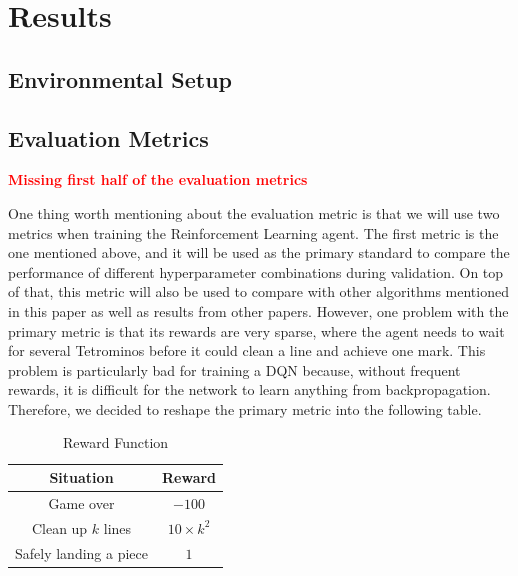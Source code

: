 \documentclass[letterpaper]{article} %
\begin{document}


\section{Results}
\subsection{Environmental Setup}
\subsection{Evaluation Metrics}

\textcolor{red}{\textbf{Missing first half of the evaluation metrics}}

One thing worth mentioning about the evaluation metric is that we will use two metrics when training the Reinforcement Learning agent. The first metric is the one mentioned above, and it will be used as the primary standard to compare the performance of different hyperparameter combinations during validation. On top of that, this metric will also be used to compare with other algorithms mentioned in this paper as well as results from other papers. However, one problem with the primary metric is that its rewards are very sparse, where the agent needs to wait for several Tetrominos before it could clean a line and achieve one mark. This problem is particularly bad for training a DQN because, without frequent rewards, it is difficult for the network to learn anything from backpropagation. Therefore, we decided to reshape the primary metric into the following table.

\begin{table}[h!]
  \centering
  \normalsize{
    \begin{tabular}{ |c|c| } 
      \hline
      Situation & Reward  \\ 
      \hline
       Game over & $-100$  \\ 
       \hline
       Clean up $k$ lines & $10\times k^{2}$  \\ 
       \hline
       Safely landing a piece & $1$  \\
       \hline
      \end{tabular}}
  \caption{Reward Function}
  \label{tab:rewardsCopy}
\end{table} 
\end{document}
